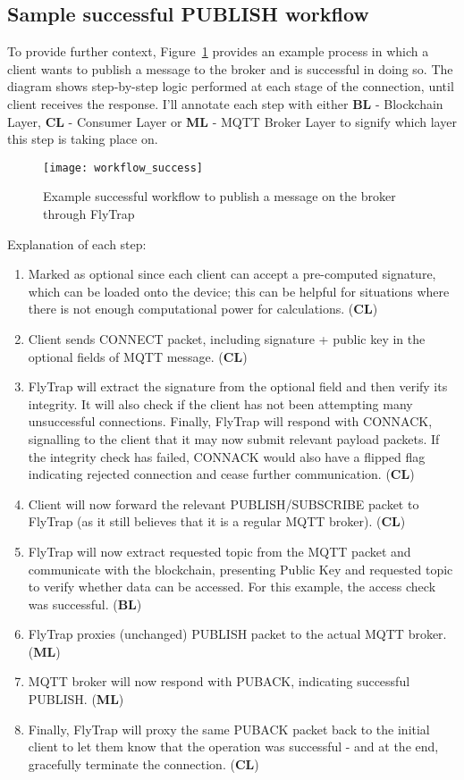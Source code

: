 \subsection{Sample successful PUBLISH workflow}
To provide further context, Figure~\ref{fig:workflow_success} provides an example process in which a client wants to publish a message to the broker and is successful in doing so. The diagram shows step-by-step logic performed at each stage of the connection, until client receives the response. I'll annotate each step with either \textbf{BL} - Blockchain Layer, \textbf{CL} - Consumer Layer or \textbf{ML} - MQTT Broker Layer to signify which layer this step is taking place on.
\begin{figure}[h]
    \centering
    \texttt{[image: workflow\_success]}
    \caption{Example successful workflow to publish a message on the broker through FlyTrap}
    \label{fig:workflow_success}
\end{figure}

Explanation of each step:
\begin{enumerate}\addtocounter{enumi}{-1}
    \item Marked as optional since each client can accept a pre-computed signature, which can be loaded onto the device; this can be helpful for situations where there is not enough computational power for calculations. (\textbf{CL})
    \item Client sends CONNECT packet, including signature + public key in the optional fields of MQTT message. (\textbf{CL})
    \item FlyTrap will extract the signature from the optional field and then verify its integrity. It will also check if the client has not been attempting many unsuccessful connections. Finally, FlyTrap will respond with CONNACK, signalling to the client that it may now submit relevant payload packets. If the integrity check has failed, CONNACK would also have a flipped flag indicating rejected connection and cease further communication. (\textbf{CL})
    \item Client will now forward the relevant PUBLISH/SUBSCRIBE packet to FlyTrap (as it still believes that it is a regular MQTT broker). (\textbf{CL})
    \item FlyTrap will now extract requested topic from the MQTT packet and communicate with the blockchain, presenting Public Key and requested topic to verify whether data can be accessed. For this example, the access check was successful. (\textbf{BL})
    \item FlyTrap proxies (unchanged) PUBLISH packet to the actual MQTT broker. (\textbf{ML})
    \item MQTT broker will now respond with PUBACK, indicating successful PUBLISH. (\textbf{ML})
    \item Finally, FlyTrap will proxy the same PUBACK packet back to the initial client to let them know that the operation was successful - and at the end, gracefully terminate the connection. (\textbf{CL})
\end{enumerate}

